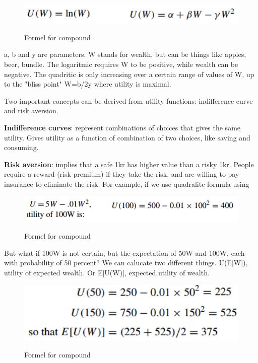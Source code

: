 \begin{figure}[ht!]
\centering
\includegraphics[width=120mm]{figures/formel1-13.png}
\label{fig:formel1-13}
\caption{Formel for compound}
\end{figure}

a, b and y are parameters. W stands for wealth, but can be things like apples, beer, bundle. The logaritmic requires W to be positive, while wealth can be negative. The quadritic is only increasing over a certain range of values of W, up to the "bliss point" W=b/2y where utility is maximal.

Two important concepts can be derived from utility functions: indifference curve and risk aversion.

\textbf{Indifference curves}: represent combinations of choices that gives the same utility. Gives utility as a function of combination of two choices, like saving and consuming.

\textbf{Risk aversion}: implies that a safe 1kr has higher value than a risky 1kr. People require a reward (risk premium) if they take the risk, and are willing to pay insurance to eliminate the risk. For example, if we use quadralitc formula using 

\begin{figure}[ht!]
\centering
\includegraphics[width=120mm]{figures/formel1-14.png}
\label{fig:formel1-14}
\caption{Formel for compound}
\end{figure}

But what if 100W is not certain, but the expectation of 50W and 100W, each with probability of 50 percent? We can calucate two different things. U(E[W]), utility of expected wealth. Or E[U(W)], expected utility of wealth.

\begin{figure}[ht!]
\centering
\includegraphics[width=120mm]{figures/formel1-15.png}
\label{fig:formel1-15}
\caption{Formel for compound}
\end{figure}

